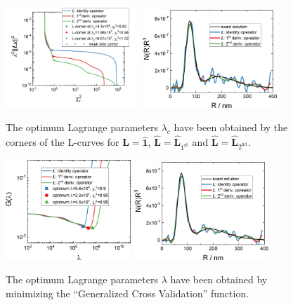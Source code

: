\begin{figure}[htb]
\centering
\includegraphics[width=0.45\textwidth]{../images/form_factor/EM/LLS_Lcorner.png}\hspace{0.02\textwidth}
\includegraphics[width=0.45\textwidth]{../images/form_factor/EM/LLS_NRR3_Lcorner.png}
\caption{The optimum Lagrange parameters $\lambda_c$ have been obtained by the corners of the L-curves for $\hat{\mathbf{L}}=\hat{\mathbf{1}}$, $\hat{\mathbf{L}}=\hat{\mathbf{L}}_\mathrm{1^{st}}$ and $\hat{\mathbf{L}}=\hat{\mathbf{L}}_\mathrm{2^{nd}}$. \label{fig:EMLcorner}}
\end{figure}

\begin{figure}[htb]
\centering
\includegraphics[width=0.42\textwidth]{../images/form_factor/EM/LLS_GCVcurve.png}\hspace{0.05\textwidth}
\includegraphics[width=0.45\textwidth]{../images/form_factor/EM/LLS_NRR3_GCVminimum.png}
\caption{The optimum Lagrange parameters $\lambda$ have been obtained by minimizing the ``Generalized Cross Validation'' function.\label{fig:EMGCVminimum}}
\end{figure}


